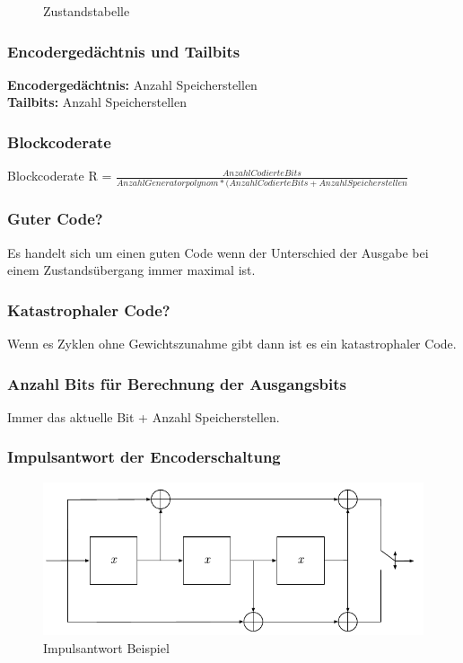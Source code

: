 \begin{figure}[h!]
\begin{minipage}[t]{0.5\textwidth}
		\caption{Zustandstabelle}
		\label{fig:zustandstabelle}
	\end{minipage}
\end{figure}

\subsubsection{Encodergedächtnis und Tailbits}
\textbf{Encodergedächtnis:} Anzahl Speicherstellen \\
\textbf{Tailbits:} Anzahl Speicherstellen\\

\subsubsection{Blockcoderate}
Blockcoderate R = $\frac{AnzahlCodierteBits}{AnzahlGeneratorpolynom*(AnzahlCodierteBits+AnzahlSpeicherstellen}$

\subsubsection{Guter Code?}
Es handelt sich um einen guten Code wenn der Unterschied der Ausgabe bei einem Zustandsübergang immer maximal ist.

\subsubsection{Katastrophaler Code?}
Wenn es Zyklen ohne Gewichtszunahme gibt dann ist es ein katastrophaler Code.

\subsubsection{Anzahl Bits für Berechnung der Ausgangsbits}
Immer das aktuelle Bit + Anzahl Speicherstellen.

\subsubsection{Impulsantwort der Encoderschaltung}
\begin{figure}[h!]
	\centering
	\begin{minipage}[t]{0.7\textwidth}
		\centering
		\includegraphics[width=0.9\linewidth]{images/impulsantwortbeispiel}
		\caption{Impulsantwort Beispiel}
		\label{fig:impulsantwortbeispiel}
	\end{minipage}
\end{figure}

